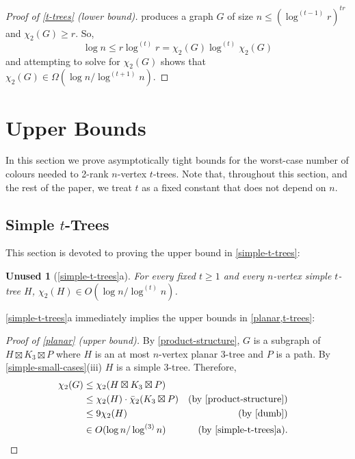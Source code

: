 \documentclass[kpfonts]{patmorin}
\newcommand{\trn}{\chi_2}
\newcommand{\dtcn}{\bar{\chi}_2}
\theoremstyle{named}
\newtheorem*{namedtheorem}{Unused}
\newcommand{\weirdref}[2]{\cref{#1}#2}
\newcommand{\weirdlabel}[2]{\label{#1-#1}}
\begin{document}
\begin{proof}[Proof of \cref{t-trees} (lower bound)]
     produces a graph $G$ of size $n \le (\log^{(t-1)} r)^{tr}$ and $\trn(G)\ge r$.  So,
    \[  \log n \le r\log^{(t)} r = \trn(G)\log^{(t)} \trn(G)\]
    and attempting to solve for $\trn(G)$ shows that $\trn(G)\in \Omega(\log n/\log^{(t+1)} n)$.
\end{proof}




\section{Upper Bounds}
\label{upper-bounds}

In this section we prove asymptotically tight bounds for the worst-case number of colours needed to 2-rank $n$-vertex $t$-trees.  Note that, throughout this section, and the rest of the paper, we treat $t$ as a fixed constant that does not depend on $n$.

\subsection{Simple $t$-Trees}

This section is devoted to proving the upper bound in \cref{simple-t-trees}:

\begin{namedtheorem}[\weirdref{simple-t-trees}{a}]\weirdlabel{simple-t-trees}{a}
    For every fixed $t\ge 1$ and every $n$-vertex simple $t$-tree $H$, $\trn(H)\in O(\log n/\log^{(t)} n)$.
\end{namedtheorem}

\weirdref{simple-t-trees}{a} immediately implies the upper bounds in \cref{planar,t-trees}:

\begin{proof}[Proof of \cref{planar} (upper bound)]
    By \cref{product-structure}, $G$ is a subgraph of $H\boxtimes K_3\boxtimes P$ where $H$ is an at most $n$-vertex planar 3-tree and $P$ is a path. By \cref{simple-small-cases}(iii) $H$ is a simple 3-tree. Therefore,
    \begin{align*}
        \trn(G) & \le \trn(H\boxtimes K_3\boxtimes P) \\
                & \le \trn(H)\cdot \dtcn(K_3\boxtimes P)
                    & \text{(by \cref{product-structure})}\\
                & \le 9\trn(H) & \text{(by \cref{dumb})} \\
                & \in O(\log n/\log^{(3)} n) & \text{(by \weirdref{simple-t-trees}{a}).} & \qedhere
    \end{align*}
\end{proof}
\end{document}
